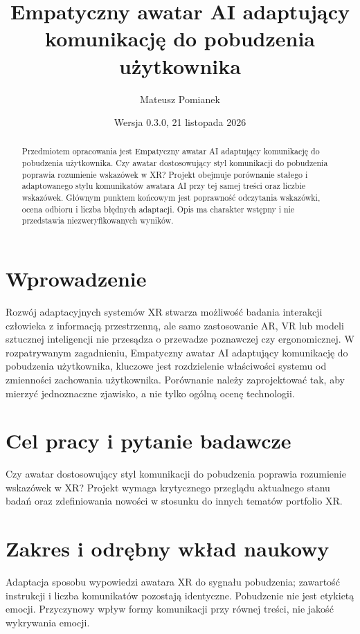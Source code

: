 \documentclass[11pt,a4paper]{article}
\title{Empatyczny awatar AI adaptujący komunikację do pobudzenia użytkownika}
\author{Mateusz Pomianek}
\date{Wersja 0.3.0, 21 listopada 2026}
\begin{document}
\maketitle

\begin{abstract}

Przedmiotem opracowania jest Empatyczny awatar AI adaptujący komunikację do pobudzenia użytkownika. Czy awatar dostosowujący styl komunikacji do pobudzenia poprawia rozumienie wskazówek w XR? Projekt obejmuje porównanie stałego i adaptowanego stylu komunikatów awatara AI przy tej samej treści oraz liczbie wskazówek. Głównym punktem końcowym jest poprawność odczytania wskazówki, ocena odbioru i liczba błędnych adaptacji. Opis ma charakter wstępny i nie przedstawia niezweryfikowanych wyników.

\end{abstract}

\section{Wprowadzenie}

Rozwój adaptacyjnych systemów XR stwarza możliwość badania interakcji człowieka z informacją przestrzenną, ale samo zastosowanie AR, VR lub modeli sztucznej inteligencji nie przesądza o przewadze poznawczej czy ergonomicznej. W rozpatrywanym zagadnieniu, Empatyczny awatar AI adaptujący komunikację do pobudzenia użytkownika, kluczowe jest rozdzielenie właściwości systemu od zmienności zachowania użytkownika. Porównanie należy zaprojektować tak, aby mierzyć jednoznaczne zjawisko, a nie tylko ogólną ocenę technologii.

\section{Cel pracy i pytanie badawcze}

Czy awatar dostosowujący styl komunikacji do pobudzenia poprawia rozumienie wskazówek w XR? Projekt wymaga krytycznego przeglądu aktualnego stanu badań oraz zdefiniowania nowości w stosunku do innych tematów portfolio XR.

\section{Zakres i odrębny wkład naukowy}
Adaptacja sposobu wypowiedzi awatara XR do sygnału pobudzenia; zawartość instrukcji i liczba komunikatów pozostają identyczne. Pobudzenie nie jest etykietą emocji. Przyczynowy wpływ formy komunikacji przy równej treści, nie jakość wykrywania emocji.
\end{document}
